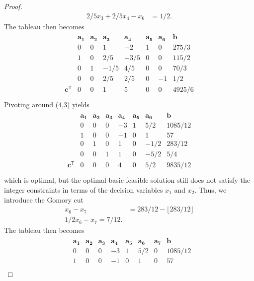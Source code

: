 \documentclass[12pt]{article}
\theoremstyle{definition}
\newcommand{\vc}[1]{\boldsymbol{#1}}
\newcommand{\tran}{\mathsf{T}}
\begin{document}
\begin{proof}
\begin{align*}
    2/5 x_3 + 2/5x_4 - x_6 &= 1/2.
  \end{align*}
  The tableau then becomes
  \begin{align*}
    \begin{matrix}
      & \vc{a_1} & \vc{a_2} & \vc{a_3} & \vc{a_4} & \vc{a_5} & \vc{a_6} & \vc{b} \\
      & 0 & 0 & 1 & -2 & 1 &  0 & 275/3 \\
      & 1 & 0 & 2/5 & -3/5 & 0 & 0 & 115/2 \\
      & 0 & 1 & -1/5 & 4/5 & 0 & 0 & 70/3 \\
      & 0 & 0 & 2/5 & 2/5 & 0 & -1& 1/2 \\
      \vc{c}^\tran & 0 & 0 & 1 & 5 & 0 & 0 &  4925/6 \\
    \end{matrix}
  \end{align*}
  Pivoting around (4,3) yields
  \begin{align*}
    \begin{matrix}
      & \vc{a_1} & \vc{a_2} & \vc{a_3} & \vc{a_4} & \vc{a_5} & \vc{a_6} & \vc{b} \\
      & 0 & 0 & 0 & -3 & 1 &  5/2 & 1085/12 \\
      & 1 & 0 & 0 & -1 & 0 & 1 & 57 \\
      & 0 & 1 & 0 & 1 & 0 & -1/2 & 283/12 \\
      & 0 & 0 & 1 & 1 & 0 & -5/2 & 5/4 \\
      \vc{c}^\tran & 0 & 0 & 0 & 4 & 0 & 5/2 &  9835/12 \\
    \end{matrix}
  \end{align*}
  which is optimal, but the optimal basic feasible solution still does not satisfy the integer
  constraints in terms of the decision variables $x_1$ and $x_2$. Thus, we introduce the Gomory cut
  \begin{align*}
    [-1/2 - \lfloor -1/2\rfloor]x_6 - x_7 &= 283/12 - \lfloor 283/12\rfloor \\
    1/2x_6 - x_7 = 7/12.
  \end{align*}
  The tableau then becomes
  \begin{align*}
    \begin{matrix}
      & \vc{a_1} & \vc{a_2} & \vc{a_3} & \vc{a_4} & \vc{a_5} & \vc{a_6} & \vc{a_7} & \vc{b} \\
      & 0 & 0 & 0 & -3 & 1 &  5/2 & 0 & 1085/12 \\
      & 1 & 0 & 0 & -1 & 0 & 1 & 0 & 57 \\

\end{matrix}
\end{align*}
\end{proof}
\end{document}
